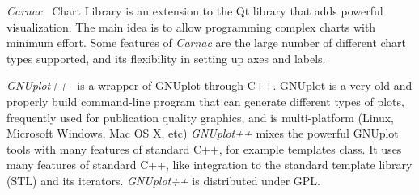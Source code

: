 \emph{Carnac}~\cite{CARNAC} Chart Library is an extension to the Qt library that adds powerful visualization.
The main idea is to allow programming complex charts with minimum effort.
Some features of \emph{Carnac} are the large number of different chart types supported,
and its flexibility in setting up axes and labels.


\emph{GNUplot++}~\cite{GNUplot++} is a wrapper of GNUplot through C++.
GNUplot is a very old and properly build command-line program that can generate different types of plots, frequently used for publication quality graphics,
and is multi-platform (Linux, Microsoft Windows, Mac OS X, etc)
\emph{GNUplot++} mixes the powerful GNUplot tools with many features of standard C++, for example templates class.
It uses many features of standard C++, like integration to the standard template library (STL) and its iterators.
\emph{GNUplot++} is distributed under GPL.

